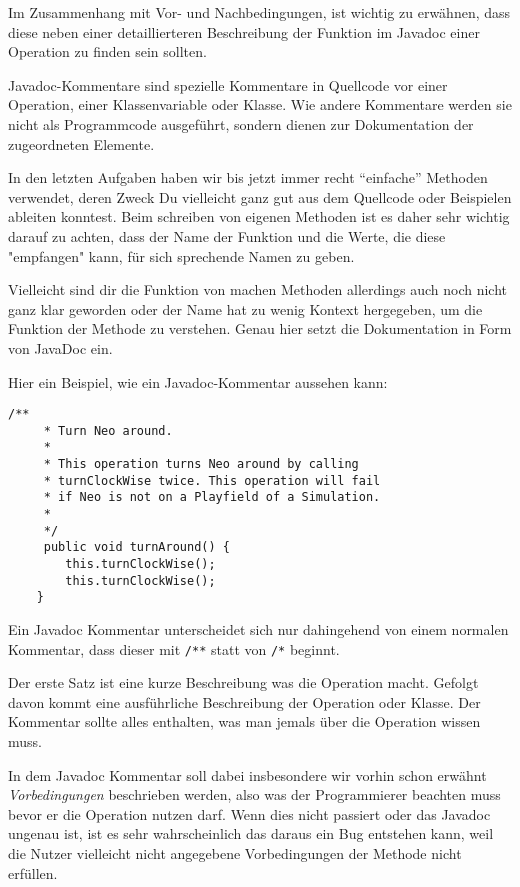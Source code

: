 \begin{Infobox}[Javadoc]
    Im Zusammenhang mit Vor- und Nachbedingungen, ist wichtig zu erwähnen, dass diese neben einer detaillierteren Beschreibung der Funktion im Javadoc einer Operation zu finden sein sollten.\newline

    Javadoc-Kommentare sind spezielle Kommentare in Quellcode vor einer Operation, einer Klassenvariable oder Klasse.
    Wie andere Kommentare werden sie nicht als Programmcode ausgeführt, sondern dienen zur Dokumentation der zugeordneten Elemente.\newline

    In den letzten Aufgaben haben wir bis jetzt immer recht \enquote{einfache} Methoden verwendet, deren Zweck Du vielleicht ganz gut aus dem Quellcode oder Beispielen ableiten konntest.
    Beim schreiben von eigenen Methoden ist es daher sehr wichtig darauf zu achten, dass der Name der Funktion und die Werte, die diese "empfangen" kann, für sich sprechende Namen zu geben.\newline

    Vielleicht sind dir die Funktion von machen Methoden allerdings auch noch nicht ganz klar geworden oder der Name hat zu wenig Kontext hergegeben, um die Funktion der Methode
zu verstehen.
    Genau hier setzt die Dokumentation in Form von JavaDoc ein.\newpage

    Hier ein Beispiel, wie ein Javadoc-Kommentar aussehen kann:

    \begin{lstlisting}[numbers=none]
    /**
     * Turn Neo around.
     *
     * This operation turns Neo around by calling
     * turnClockWise twice. This operation will fail
     * if Neo is not on a Playfield of a Simulation.
     *
     */
     public void turnAround() {
        this.turnClockWise();
        this.turnClockWise();
    }
    \end{lstlisting}

    Ein Javadoc Kommentar unterscheidet sich nur dahingehend von einem normalen Kommentar, dass dieser mit \lstinline{/**} statt von \lstinline{/*} beginnt.\newline

    Der erste Satz ist eine kurze Beschreibung was die Operation macht.
    Gefolgt davon kommt eine ausführliche Beschreibung der Operation oder Klasse.
    Der Kommentar sollte alles enthalten, was man jemals über die Operation wissen muss.\newline

    In dem Javadoc Kommentar soll dabei insbesondere wir vorhin schon erwähnt \textit{Vorbedingungen} beschrieben werden, also was der Programmierer beachten muss bevor er die Operation nutzen darf.
    Wenn dies nicht passiert oder das Javadoc ungenau ist, ist es sehr wahrscheinlich das daraus ein Bug entstehen kann, weil die Nutzer vielleicht nicht angegebene Vorbedingungen der Methode nicht erfüllen.

\end{Infobox}

